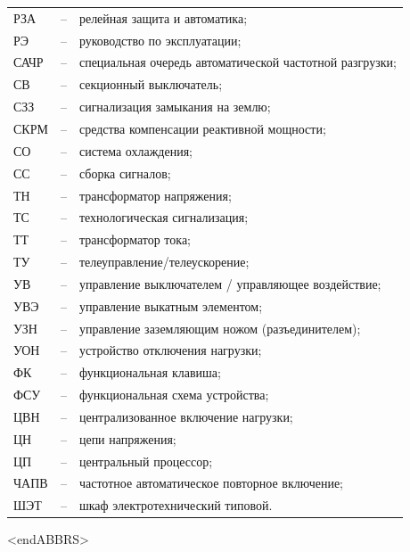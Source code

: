 \begin{longtable}{>{\raggedright\arraybackslash}m{2cm}>{\raggedright\arraybackslash}m{0.5cm}>{\raggedright\arraybackslash}m{20cm}}
РЗА & -- & релейная защита и автоматика; \\
РЭ & -- & руководство по эксплуатации; \\
САЧР & -- & специальная очередь автоматической частотной разгрузки; \\
СВ & -- & секционный выключатель; \\
СЗЗ & -- & сигнализация замыкания на землю; \\
СКРМ & -- & средства компенсации реактивной мощности; \\
СО & -- & система охлаждения; \\
СС & -- & сборка сигналов; \\
ТН & -- & трансформатор напряжения; \\
ТС & -- & технологическая сигнализация; \\
ТТ & -- & трансформатор тока; \\
ТУ & -- & телеуправление/телеускорение; \\
УВ & -- & управление выключателем / управляющее воздействие; \\
УВЭ & -- & управление выкатным элементом; \\
УЗН & -- & управление заземляющим ножом (разъединителем); \\
УОН & -- & устройство отключения нагрузки; \\
ФК & -- & функциональная клавиша; \\
ФСУ & -- & функциональная схема устройства; \\
ЦВН & -- & централизованное включение нагрузки; \\
ЦН & -- & цепи напряжения; \\
ЦП & -- & центральный процессор; \\
ЧАПВ & -- & частотное автоматическое повторное включение; \\
ШЭТ & -- & шкаф электротехнический типовой. \\
\end{longtable}
{\color{white}\fontsize{0.1pt}{0.1pt}\selectfont<endABBRS>}